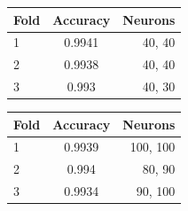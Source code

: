 \documentclass[12pt]{report}
\begin{document}
\par\null\par

\begin{center}
\begin{tabular}{lcr}
\toprule
Fold & Accuracy & Neurons \\
\midrule
1  & 0.9941 & 40, 40\\
2  & 0.9938 & 40, 40\\
3  & 0.993 & 40, 30\\
\bottomrule
\end{tabular}
\end{center}

\par\null\par

\begin{center}
\begin{tabular}{lcr}
\toprule
Fold & Accuracy & Neurons \\
\midrule
1  & 0.9939 & 100, 100\\
2  & 0.994 & 80, 90\\
3  & 0.9934 & 90, 100\\
\bottomrule
\end{tabular}
\end{center}
\end{document}
